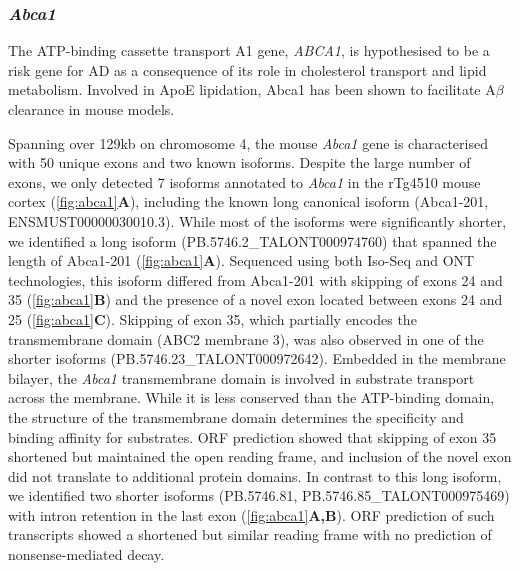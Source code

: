 \clearpage
\subsubsection{\textit{Abca1}}
The ATP-binding cassette transport A1 gene, \textit{ABCA1}, is hypothesised to be a risk gene for AD as a consequence of its role in cholesterol transport and lipid metabolism\cite{Nordestgaard2015}. Involved in ApoE lipidation, Abca1 has been shown to facilitate A$\beta$ clearance in mouse models\cite{Fitz2012}. 

Spanning over 129kb on chromosome 4, the mouse \textit{Abca1} gene is characterised with 50 unique exons and two known isoforms. Despite the large number of exons, we only detected 7 isoforms annotated to \textit{Abca1} in the rTg4510 mouse cortex (\cref{fig:abca1}\textbf{A}), including the known long canonical isoform (Abca1-201, ENSMUST00000030010.3). While most of the isoforms were significantly shorter, we identified a long isoform (PB.5746.2\_TALONT000974760) that spanned the length of Abca1-201 (\cref{fig:abca1}\textbf{A}). Sequenced using both Iso-Seq and ONT technologies, this isoform differed from Abca1-201 with skipping of exons 24 and 35 (\cref{fig:abca1}\textbf{B}) and the presence of a novel exon located between exons 24 and 25 (\cref{fig:abca1}\textbf{C}). Skipping of exon 35, which partially encodes the transmembrane domain (ABC2 membrane 3), was also observed in one of the shorter isoforms (PB.5746.23\_TALONT000972642). Embedded in the membrane bilayer, the \textit{Abca1} transmembrane domain is involved in substrate transport across the membrane. While it is less conserved than the ATP-binding domain, the structure of the transmembrane domain determines the specificity and binding affinity for substrates. ORF prediction showed that skipping of exon 35 shortened but maintained the open reading frame, and inclusion of the novel exon did not translate to additional protein domains. In contrast to this long isoform, we identified two shorter isoforms (PB.5746.81, PB.5746.85\_TALONT000975469) with intron retention in the last exon (\cref{fig:abca1}\textbf{A,B}). ORF prediction of such transcripts showed a shortened but similar reading frame with no prediction of nonsense-mediated decay. 

